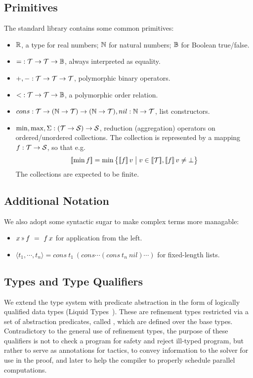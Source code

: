 \subsection{Primitives}

The standard library contains some common primitives:

\begin{itemize}
  \item $\mathbb{R}$, a type for real numbers; $\mathbb{N}$ for natural numbers; $\mathbb{B}$ for Boolean true/false.
  \item ${=} : \mathcal{T}\to\mathcal{T}\to\mathbb{B}$, always interpreted as equality.
  \item ${+}, {-} : \mathcal{T}\to\mathcal{T}\to\mathcal{T}$, polymorphic binary operators.
  \item ${<} : \mathcal{T}\to\mathcal{T}\to\mathbb{B}$, a polymorphic order relation.
  \item $cons : \mathcal{T}\to(\mathbb{N}\to\mathcal{T})\to(\mathbb{N}\to\mathcal{T}), nil : \mathbb{N}\to\mathcal{T}$, list constructors.
  \item $\min, \max, \Sigma : (\mathcal{T}\to\mathcal{S})\to\mathcal{S}$, reduction (aggregation) operators
    on ordered/unordered collections. The collection is represented by a mapping $f : \mathcal{T}\to\mathcal{S}$,
    so that e.g. \[\semp{\min f} = \min \big\{\semp{f}\,v \;\big|\; v\in\semp{\T}, \semp{f}\,v\neq\bot\big\}\]
    The collections are expected to be finite.
\end{itemize}

\subsection{Additional Notation}
\newcommand\applt{\textrm{{\scriptsize\,}\guillemotright{\scriptsize\,}}}

We also adopt some syntactic sugar to make complex terms more managable:

\begin{itemize}
  \item $x \applt f ~=~ f\,x$ for application from the left.
  \item $\langle t_1,\cdots,t_n\rangle = cons~t_1 ~ (cons \cdots (cons~t_n ~ nil) \cdots)$
    for fixed-length lists.
\end{itemize}

\subsection{Types and Type Qualifiers}

We extend the type system with predicate abstraction in the form of logically qualified data types 
(Liquid Types~\cite{PLDI08/Rondon}). These are refinement types restricted via a set of abstraction predicates,
called , which are defined over the base types.
Contradictory to the general use of refinement types, the purpose of these qualifiers is not to
check a program for safety and reject ill-typed program, but rather to serve as annotations for
tactics, to convey information to the solver for use in the proof, and later to help the compiler
to properly schedule parallel computations.

